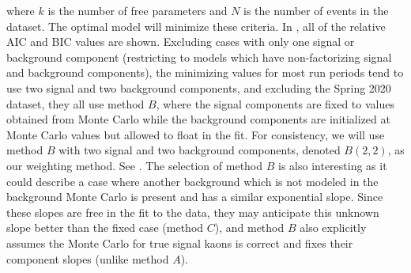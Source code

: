 where $k$ is the number of free parameters and $N$ is the number of events in the dataset. The optimal model will minimize these criteria. In , all of the relative AIC and BIC values are shown. Excluding cases with only one signal or background component (restricting to models which have non-factorizing signal and background components), the minimizing values for most run periods tend to use two signal and two background components, and excluding the Spring 2020 dataset, they all use method $B$, where the signal components are fixed to values obtained from Monte Carlo while the background components are initialized at Monte Carlo values but allowed to float in the fit. For consistency, we will use method $B$ with two signal and two background components, denoted $B(2,2)$, as our weighting method. See . The selection of method $B$ is also interesting as it could describe a case where another background which is not modeled in the background Monte Carlo is present and has a similar exponential slope. Since these slopes are free in the fit to the data, they may anticipate this unknown slope better than the fixed case (method $C$), and method $B$ also explicitly assumes the Monte Carlo for true signal kaons is correct and fixes their component slopes (unlike method $A$).


